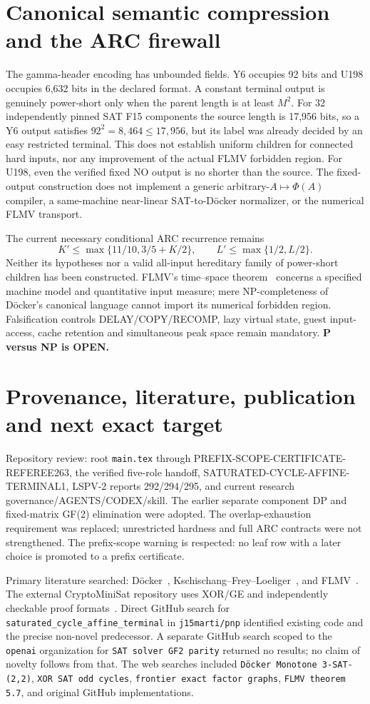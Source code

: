 \documentclass[11pt]{article}
\begin{document}
\section{Canonical semantic compression and the ARC firewall}
The gamma-header encoding has unbounded fields. Y6 occupies 92 bits and U198 occupies 6,632 bits in the declared format. A constant terminal output is genuinely power-short only when the parent length is at least $M^2$. For 32 independently pinned SAT F15 components the source length is 17,956 bits, so a Y6 output satisfies $92^2=8,464\le17,956$, but its label was already decided by an easy restricted terminal. This does not establish uniform children for connected hard inputs, nor any improvement of the actual FLMV forbidden region. For U198, even the verified fixed NO output is no shorter than the source. The fixed-output construction does not implement a generic arbitrary-$A\mapsto\Phi(A)$ compiler, a same-machine near-linear SAT-to-D\"ocker normalizer, or the numerical FLMV transport.

The current necessary conditional ARC recurrence remains
\[
 K'\le\max\{11/10,3/5+K/2\},\qquad
 L'\le\max\{1/2,L/2\}.
\]
Neither its hypotheses nor a valid all-input hereditary family of power-short children has been constructed. FLMV's time--space theorem~\cite{flmv2005} concerns a specified machine model and quantitative input measure; mere NP-completeness of D\"ocker's canonical language cannot import its numerical forbidden region. Falsification controls DELAY/COPY/RECOMP, lazy virtual state, guest input-access, cache retention and simultaneous peak space remain mandatory. \textbf{P versus NP is OPEN.}

\section{Provenance, literature, publication and next exact target}
Repository review: root \texttt{main.tex} through PREFIX-SCOPE-CERTIFICATE-REFEREE263, the verified five-role handoff, SATURATED-CYCLE-AFFINE-TERMINAL1, LSPV-2 reports 292/294/295, and current research governance/AGENTS/CODEX/skill. The earlier separate component DP and fixed-matrix GF(2) elimination were adopted. The overlap-exhaustion requirement was replaced; unrestricted hardness and full ARC contracts were not strengthened. The prefix-scope warning is respected: no leaf row with a later choice is promoted to a prefix certificate.

Primary literature searched: D\"ocker~\cite{doecker2019}, Kschischang--Frey--Loeliger~\cite{kschischang2001}, and FLMV~\cite{flmv2005}. The external CryptoMiniSat repository uses XOR/GE and independently checkable proof formats~\cite{cryptominisat}. Direct GitHub search for \texttt{saturated\_cycle\_affine\_terminal} in \texttt{j15marti/pnp} identified existing code and the precise non-novel predecessor. A separate GitHub search scoped to the \texttt{openai} organization for \texttt{SAT solver GF2 parity} returned no results; no claim of novelty follows from that. The web searches included \texttt{D\"ocker Monotone 3-SAT-(2,2)}, \texttt{XOR SAT odd cycles}, \texttt{frontier exact factor graphs}, \texttt{FLMV theorem 5.7}, and original GitHub implementations.
\end{document}
